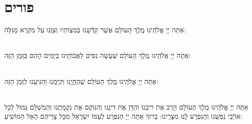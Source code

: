 \documentclass[twoside, openany, parskip=half, 11pt]{book}
\begin{document}

\chapter[פורים]{ פורים }

\label{purim}

 אַתָּה יְיָ אֱלֹהֵֽינוּ מֶֽלֶךְ הָעוֹלָם 
אֲשֶׁר קִדְּֿשָֽׁנוּ בְּמִצְוֹתָיו וְצִוָּֽנוּ עַל מִקְרָא מְגִלָּה:

\\
 אַתָּה יְיָ אֱלֹהֵֽינוּ מֶֽלֶךְ הָעוֹלָם שֶׁעָשָׂה נִסִּים לַאֲבוֹתֵֽינוּ בַּיָּמִים הָהֵם בַּזְּמַן הַזֶּה:

\\
 אַתָּה יְיָ אֱלֹהֵֽינוּ מֶֽלֶךְ הָעוֹלָם שֶׁהֶחֱיָֽנוּ וְקִיְּמָֽנוּ וְהִגִּיעָֽנוּ לַזְּמַן הַזֶּה:


	\\
	 אַתָּה יְיָ אֱלֹהֵֽינוּ מֶֽלֶךְ הָעוֹלָם הָרָב אֶת רִיבֵֽנוּ וְהַדָּן אֶת דִּינֵֽנוּ וְהַנּוֹקֵם אֶת נִקְמָתֵֽנוּ וְהַמְשַׁלֵּם גְּמוּל לְכָל אוֹיְֿבֵי נַפְשֵֽׁנוּ וְהַנִּפְרָע לָֽנוּ מִצָּרֵֽינוּ: בָּרוּךְ אַתָּה יְיָ הַנִּפְרָע לְעַמּוֹ יִשְׂרָאֵל מִכָּל צָרֵיהֶם הָאֵל הַמּוֹשִֽׁיעַ:
	
	
\end{document}
